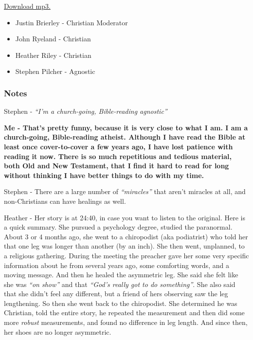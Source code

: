 \href{http://media.premier.org.uk/unbelievable/ba5b6360-edf3-4218-8878-3292237289f5.mp3}{Download
mp3.}

\begin{itemize}
\itemsep1pt\parskip0pt
\item
  Justin Brierley - Christian Moderator
\item
  John Ryeland - Christian
\item
  Heather Riley - Christian
\item
  Stephen Pilcher - Agnostic
\end{itemize}

\subsubsection{Notes}\label{notes}

Stephen - \emph{``I'm a church-going, Bible-reading agnostic''}

\textbf{Me - That's pretty funny, because it is very close to what I am.
I am a church-going, Bible-reading atheist. Although I have read the
Bible at least once cover-to-cover a few years ago, I have lost patience
with reading it now. There is so much repetitious and tedious material,
both Old and New Testament, that I find it hard to read for long without
thinking I have better things to do with my time.\\}

Stephen - There are a large number of \emph{``miracles''} that aren't
miracles at all, and non-Christians can have healings as well.

Heather - Her story is at 24:40, in case you want to listen to the
original. Here is a quick summary. She pursued a psychology degree,
studied the paranormal. About 3 or 4 months ago, she went to a
chiropodist (aka podiatrist) who told her that one leg was longer than
another (by an inch). She then went, unplanned, to a religious
gathering. During the meeting the preacher gave her some very specific
information about he from several years ago, some comforting words, and
a moving message. And then he healed the asymmetric leg. She said she
felt like she was \emph{``on show''} and that \emph{``God's really got
to do something''}. She also said that she didn't feel any different,
but a friend of hers observing saw the leg lengthening. So then she went
back to the chiropodist. She determined he was Christian, told the
entire story, he repeated the measurement and then did some more
\emph{robust} measurements, and found no difference in leg length. And
since then, her shoes are no longer asymmetric.

